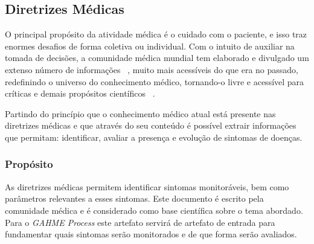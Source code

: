 \subsection{Diretrizes Médicas}\label{subsec:diretrizes_medicas}
O principal propósito da atividade médica é o cuidado com o paciente, e isso traz enormes desafios de forma coletiva ou individual. Com o intuito de auxiliar na tomada de decisões, a comunidade médica mundial tem elaborado e divulgado um extenso número de informações ~\cite{nhs2013,neozeland-guide-2013}, muito mais acessíveis do que era no passado, redefinindo o universo do conhecimento médico, tornando-o livre e acessível para críticas e demais propósitos científicos ~\cite{proj-diretriz2013}.

%

Partindo do princípio que o conhecimento médico atual está presente nas diretrizes médicas e que através do seu conteúdo é possível extrair informações que permitam: identificar, avaliar a presença e evolução de sintomas de doenças. 
\subsubsection{Propósito}
As diretrizes médicas permitem identificar sintomas monitoráveis, bem como parâmetros relevantes a esses sintomas. Este documento é escrito pela comunidade médica e é considerado como base científica sobre o tema abordado. Para o \textit{GAHME Process} este artefato servirá de artefato de entrada para fundamentar quais sintomas serão monitorados e de que forma serão avaliados.



